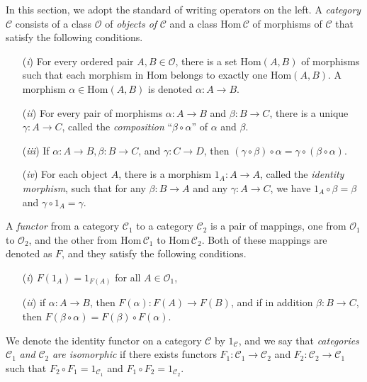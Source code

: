 \documentclass{surv-l}
\numberwithin{equation}{section}
\numberwithin{table}{section}
\numberwithin{figure}{section}
\theoremstyle{plain}
\theoremstyle{definition}
\begin{document}
In this section, we adopt the standard of writing operators on the
left. A \emph{category} $\mathcal{C}$ consists of a class
$\mathcal{O}$ of \emph{objects of} $\mathcal{C}$ and a class
$\mathrm{Hom}\,\mathcal{C}$ of morphisms of $\mathcal{C}$ that
satisfy the following conditions.
\begin{enumerate}
\item[(\emph{i})] For every ordered pair $A, B\in \mathcal{O}$, there is a
set $\mathrm{Hom}(A, B)$ of morphisms such that each
morphism in Hom belongs to exactly one $\mathrm{Hom}(A,
B)$. A morphism $\alpha\in \mathrm{Hom}(A, B)$ is denoted
$\alpha : A\rightarrow B$.

\item[(\emph{ii})] For every pair of morphisms $\alpha : A\rightarrow B$ and
$\beta : B\rightarrow C$, there is a unique $\gamma :
A\rightarrow C$, called the \emph{composition}
``$\beta\circ\alpha$'' of $\alpha$ and $\beta$.

\item[(\emph{iii})] If $\alpha : A\rightarrow B, \beta : B\rightarrow C$, and
$\gamma : C\rightarrow D$, then
$(\gamma\circ\beta)\circ\alpha=\gamma\circ(\beta\circ\alpha)$.

\item[(\emph{iv})] For each object $A$, there is a morphism $1_{A} :
A\rightarrow A$, called the \emph{identity
morphism}, such that for any
$\beta : B\rightarrow A$ and any $\gamma : A\rightarrow C$, we
have $1_{A}\circ \beta=\beta$ and $\gamma \circ 1_{A}=\gamma$.
\end{enumerate}

A \emph{functor} from a category $\mathcal{C}_{1}$ to a category
$\mathcal{C}_{2}$ is a pair of mappings, one from
$\mathcal{O}_{1}$ to $\mathcal{O}_{2}$, and the other from
$\mathrm{Hom}\,\mathcal{C}_{1}$ to $\mathrm{Hom}\,\mathcal{C}_{2}$. Both of
these mappings are denoted as $F$, and they satisfy the following
conditions.
\begin{enumerate}
\item[(\emph{i})] $F(1_{A})=1_{F(A)}$ for all $A\in \mathcal{O}_{1}$,

\item[(\emph{ii})] if $\alpha : A\rightarrow B$, then $F(\alpha) :
F(A)\rightarrow F(B)$, and if in addition $\beta :
B\rightarrow C$, then $F(\beta \circ
\alpha)=F(\beta)\circ F(\alpha)$.
\end{enumerate}

We denote the identity functor on a category $\mathcal{C}$ by
$1_{\mathcal{C}}$, and we say that \emph{categories}
$\mathcal{C}_{1}$ \emph{and} $\mathcal{C}_{2}$ \emph{are
isomorphic} if there exists functors $F_{1} :
\mathcal{C}_{1}\rightarrow \mathcal{C}_{2}$ and $F_{2} :
\mathcal{C}_{2}\rightarrow \mathcal{C}_{1}$ such that $F_{2}\circ
F_{1}=1_{\mathcal{C}_{1}}$ and $F_{1}\circ
F_{2}=1_{\mathcal{C}_{2}}$.
\end{document}
